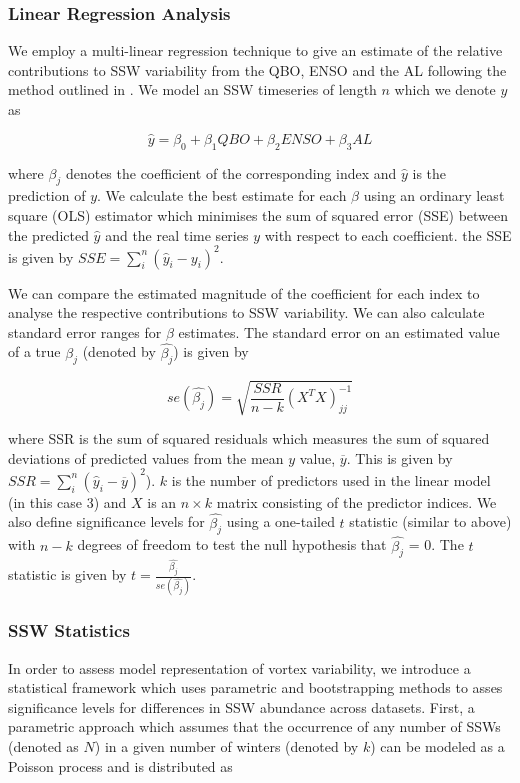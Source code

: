 \subsubsection*{Linear Regression Analysis}
We employ a multi-linear regression technique to give an estimate of the relative contributions to SSW variability from the QBO, ENSO and the AL following the method outlined in \cite{Krzywinski}. We model an SSW timeseries of length $n$ which we denote $y$ as 

\begin{equation} \label{regression}
\hat{y} = \beta_0 + \beta_{1}QBO + \beta_{2}ENSO + \beta_{3}AL
\end{equation}

where $\beta_j$ denotes the coefficient of the corresponding index and $\hat{y}$ is the prediction of $y$. We calculate the best estimate for each $\beta$ using an ordinary least square (OLS) estimator which minimises the sum of squared error (SSE) between the predicted $\hat{y}$ and the real time series $y$ with respect to each coefficient. the SSE is given by $SSE = \sum_i^n{(\hat{y}_i - y_i)^2}$.

We can compare the estimated magnitude of the coefficient for each index to analyse the respective contributions to SSW variability. We can also calculate standard error ranges for $\beta$ estimates. The standard error on an estimated value of a true $\beta_j$ (denoted by $\hat{\beta_j}$) is given by 

\begin{equation} \label{regression}
se(\hat{\beta_j}) = \sqrt{\frac{SSR}{n - k} (X^TX)^{-1}_{jj}}
\end{equation}

where SSR is the sum of squared residuals which measures the sum of squared deviations of predicted values from the mean $y$ value, $\overline{y}$. This is given by $SSR = \sum_i^n{(\hat{y}_i - \overline{y})^2}$). $k$ is the number of predictors used in the linear model (in this case 3) and $X$ is an $n \times k$ matrix consisting of the predictor indices. We also define significance levels for $\hat{\beta_j}$ using a one-tailed $t$ statistic (similar to above) with $n-k$ degrees of freedom to test the null hypothesis that $\hat{\beta_j}$ = 0. The $t$ statistic is given by $t = \frac{\hat{\beta_j}}{se(\hat{\beta_j})}$.

\subsubsection*{SSW Statistics}
In order to assess model representation of vortex variability, we introduce a statistical framework which uses parametric and bootstrapping methods to asses significance levels for differences in SSW abundance across datasets. First, a parametric approach which assumes that the occurrence of any number of SSWs (denoted as $N$) in a given number of winters (denoted by $k$) can be modeled as a Poisson process and is distributed as 

